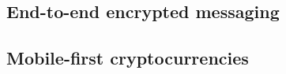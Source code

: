 	\subsection{End-to-end encrypted messaging}
	
	\subsection{Mobile-first cryptocurrencies}
	
	
	
	
	
	
	
	
	
	
	
	
	
	
	
	
	
	
	
	
	
	
	
	
	
	
	
	
